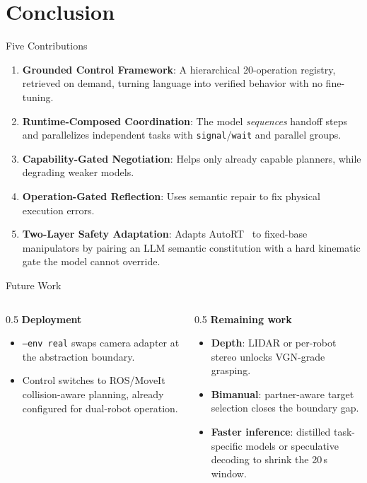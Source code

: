 \documentclass[aspectratio=169,11pt]{beamer}
\begin{document}
\section{Conclusion}

\begin{frame}{Five Contributions}
	\begin{enumerate}
		\item \textbf{Grounded Control Framework}: A hierarchical 20-operation registry, retrieved on demand, turning language into verified behavior with no fine-tuning.
		\item \textbf{Runtime-Composed Coordination}: The model \textit{sequences} handoff steps and parallelizes independent tasks with \texttt{signal}/\texttt{wait} and parallel groups.
		\item \textbf{Capability-Gated Negotiation}: Helps only already capable planners, while degrading weaker models.
		\item \textbf{Operation-Gated Reflection}: Uses semantic repair to fix physical execution errors.
		\item \textbf{Two-Layer Safety Adaptation}: Adapts AutoRT~\cite{ahn2024autortembodiedfoundationmodels} to fixed-base manipulators by pairing an LLM semantic constitution with a hard kinematic gate the model cannot override.
	\end{enumerate}
\end{frame}

\begin{frame}{Future Work}
	\begin{columns}[T]
		\begin{column}{0.5\textwidth}
			\textbf{Deployment}
			\begin{itemize}\footnotesize
				\item \texttt{--env real} swaps camera adapter at the abstraction boundary.
				\item Control switches to ROS/MoveIt collision-aware planning, already configured for dual-robot operation.
			\end{itemize}
		\end{column}
		\begin{column}{0.5\textwidth}
			\textbf{Remaining work}
			\begin{itemize}\footnotesize
				\item \textbf{Depth}: LIDAR or per-robot stereo unlocks VGN-grade grasping.
				\item \textbf{Bimanual}: partner-aware target selection closes the boundary gap.
				\item \textbf{Faster inference}: distilled task-specific models or speculative decoding to shrink the 20\,s window.
			\end{itemize}
		\end{column}
	\end{columns}
\end{frame}
\end{document}
